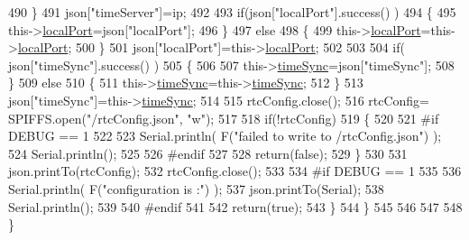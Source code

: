 \begin{DoxyCode}
490             \}
491             json[\textcolor{stringliteral}{"timeServer"}]=ip;
492             
493             \textcolor{keywordflow}{if}(json[\textcolor{stringliteral}{"localPort"}].success() )
494             \{                       
495                 this->\hyperlink{class_cool_time_a2f777da44d7ba678be8185299e9b49d1}{localPort}=json[\textcolor{stringliteral}{"localPort"}];
496             \}
497             \textcolor{keywordflow}{else}
498             \{
499                 this->\hyperlink{class_cool_time_a2f777da44d7ba678be8185299e9b49d1}{localPort}=this->\hyperlink{class_cool_time_a2f777da44d7ba678be8185299e9b49d1}{localPort};
500             \}
501             json[\textcolor{stringliteral}{"localPort"}]=this->\hyperlink{class_cool_time_a2f777da44d7ba678be8185299e9b49d1}{localPort};
502 
503 
504             \textcolor{keywordflow}{if}( json[\textcolor{stringliteral}{"timeSync"}].success() )
505             \{
506 
507                 this->\hyperlink{class_cool_time_a9d032e76c3470a15b3bbbc52af6463f7}{timeSync}=json[\textcolor{stringliteral}{"timeSync"}];
508             \}
509             \textcolor{keywordflow}{else}
510             \{
511                 this->\hyperlink{class_cool_time_a9d032e76c3470a15b3bbbc52af6463f7}{timeSync}=this->\hyperlink{class_cool_time_a9d032e76c3470a15b3bbbc52af6463f7}{timeSync};
512             \}
513             json[\textcolor{stringliteral}{"timeSync"}]=this->\hyperlink{class_cool_time_a9d032e76c3470a15b3bbbc52af6463f7}{timeSync};
514 
515             rtcConfig.close();
516             rtcConfig= SPIFFS.open(\textcolor{stringliteral}{"/rtcConfig.json"}, \textcolor{stringliteral}{"w"});
517             
518             \textcolor{keywordflow}{if}(!rtcConfig)
519             \{
520             
521 \textcolor{preprocessor}{            #if DEBUG == 1}
522 
523                 Serial.println( F(\textcolor{stringliteral}{"failed to write to /rtcConfig.json"}) );
524                 Serial.println();
525             
526 \textcolor{preprocessor}{            #endif}
527 
528                 \textcolor{keywordflow}{return}(\textcolor{keyword}{false});
529             \}
530             
531             json.printTo(rtcConfig);
532             rtcConfig.close();
533 
534 \textcolor{preprocessor}{        #if DEBUG == 1 }
535 
536             Serial.println( F(\textcolor{stringliteral}{"configuration is :"}) );
537             json.printTo(Serial);
538             Serial.println();
539         
540 \textcolor{preprocessor}{        #endif}
541         
542             \textcolor{keywordflow}{return}(\textcolor{keyword}{true}); 
543         \}
544     \}   
545 
546 
547 
548 \}
\end{DoxyCode}
